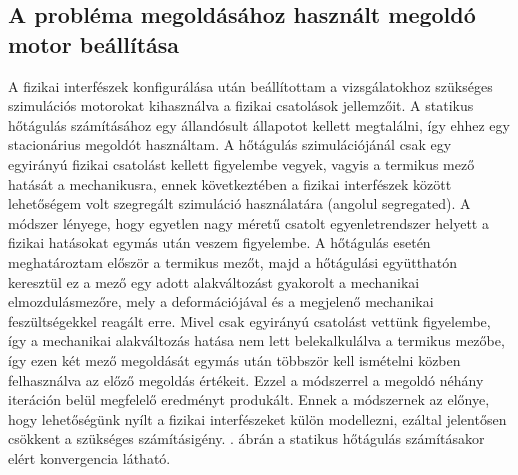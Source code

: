 
\subsection{A probléma megoldásához használt megoldó motor beállítása}

A fizikai interfészek konfigurálása után beállítottam a vizsgálatokhoz szükséges szimulációs motorokat kihasználva a fizikai csatolások jellemzőit. A statikus hőtágulás számításához egy állandósult állapotot kellett megtalálni, így ehhez egy stacionárius megoldót használtam. A hőtágulás szimulációjánál csak egy egyirányú fizikai csatolást kellett figyelembe vegyek, vagyis a termikus mező hatását a mechanikusra, ennek következtében a fizikai interfészek között lehetőségem volt szegregált szimuláció használatára (angolul segregated). A módszer lényege, hogy egyetlen nagy méretű csatolt egyenletrendszer helyett a fizikai hatásokat egymás után veszem figyelembe. A hőtágulás esetén meghatároztam először a termikus mezőt, majd a hőtágulási együtthatón keresztül ez a mező egy adott alakváltozást gyakorolt a mechanikai elmozdulásmezőre, mely a deformációjával és a megjelenő mechanikai feszültségekkel reagált erre. Mivel csak egyirányú csatolást vettünk figyelembe, így a mechanikai alakváltozás hatása nem lett belekalkulálva a termikus mezőbe, így ezen két mező megoldását egymás után többször kell ismételni közben felhasználva az előző megoldás értékeit. Ezzel a módszerrel a megoldó néhány iteráción belül megfelelő eredményt produkált. Ennek a módszernek az előnye, hogy lehetőségünk nyílt a fizikai interfészeket külön modellezni, ezáltal jelentősen csökkent a szükséges számításigény. . ábrán a statikus hőtágulás számításakor elért konvergencia látható.

